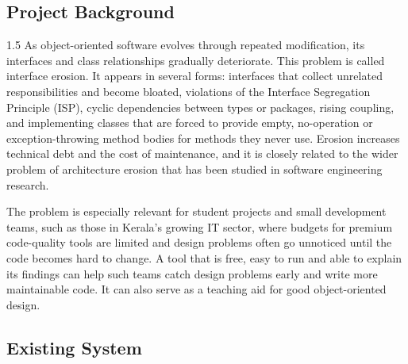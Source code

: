 \documentclass[12pt,a4paper]{article}
\begin{document}
\subsection{Project Background}

\begin{spacing}{1.5}
\justifying
As object-oriented software evolves through repeated modification, its
interfaces and class relationships gradually deteriorate. This problem is
called interface erosion. It appears in several forms: interfaces that
collect unrelated responsibilities and become bloated, violations of the
Interface Segregation Principle (ISP), cyclic dependencies between types
or packages, rising coupling, and implementing classes that are forced to
provide empty, no-operation or exception-throwing method bodies for methods
they never use. Erosion increases technical debt and the cost of maintenance,
and it is closely related to the wider problem of architecture erosion that
has been studied in software engineering research.

The problem is especially relevant for student projects and small development
teams, such as those in Kerala's growing IT sector, where budgets for premium
code-quality tools are limited and design problems often go unnoticed until
the code becomes hard to change. A tool that is free, easy to run and able
to explain its findings can help such teams catch design problems early
and write more maintainable code. It can also serve as a teaching aid for
good object-oriented design.
\end{spacing}

\subsection{Existing System}
\end{document}
